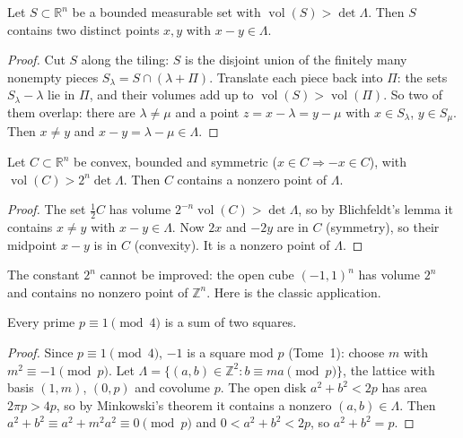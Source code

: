 \begin{lemma}[Blichfeldt]\label{lem:blichfeldt}
Let $S\subset\mathbb R^n$ be a bounded measurable set with $\operatorname{vol}(S)>\det\Lambda$. Then $S$ contains two distinct points $x,y$ with $x-y\in\Lambda$.
\end{lemma}

\begin{proof}
Cut $S$ along the tiling: $S$ is the disjoint union of the finitely many nonempty pieces $S_\lambda=S\cap(\lambda+\Pi)$. Translate each piece back into $\Pi$:
the sets $S_\lambda-\lambda$ lie in $\Pi$, and their volumes add up to $\operatorname{vol}(S)>\operatorname{vol}(\Pi)$. So two of them overlap: there are
$\lambda\ne\mu$ and a point $z=x-\lambda=y-\mu$ with $x\in S_\lambda$, $y\in S_\mu$. Then $x\ne y$ and $x-y=\lambda-\mu\in\Lambda$.
\end{proof}

\begin{theorem}[Minkowski]\label{thm:minkowski}
Let $C\subset\mathbb R^n$ be convex, bounded and symmetric ($x\in C\Rightarrow-x\in C$), with $\operatorname{vol}(C)>2^n\det\Lambda$. Then $C$ contains a nonzero
point of $\Lambda$.
\end{theorem}

\begin{proof}
The set $\frac12C$ has volume $2^{-n}\operatorname{vol}(C)>\det\Lambda$, so by Blichfeldt's lemma it contains $x\ne y$ with $x-y\in\Lambda$. Now $2x$ and $-2y$ are in
$C$ (symmetry), so their midpoint $x-y$ is in $C$ (convexity). It is a nonzero point of $\Lambda$.
\end{proof}

The constant $2^n$ cannot be improved: the open cube $(-1,1)^n$ has volume $2^n$ and contains no nonzero point of $\mathbb Z^n$. Here is the classic application.

\begin{theorem}[Fermat]\label{thm:twosquares}
Every prime $p\equiv1\pmod4$ is a sum of two squares.
\end{theorem}

\begin{proof}
Since $p\equiv1\pmod4$, $-1$ is a square mod $p$ (Tome~1): choose $m$ with $m^2\equiv-1\pmod p$. Let $\Lambda=\{(a,b)\in\mathbb Z^2:b\equiv ma\pmod p\}$, the
lattice with basis $(1,m)$, $(0,p)$ and covolume $p$. The open disk $a^2+b^2<2p$ has area $2\pi p>4p$, so by Minkowski's theorem it contains a nonzero
$(a,b)\in\Lambda$. Then $a^2+b^2\equiv a^2+m^2a^2\equiv0\pmod p$ and $0<a^2+b^2<2p$, so $a^2+b^2=p$.
\end{proof}

